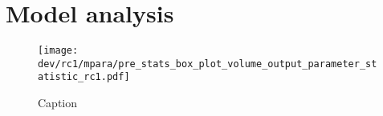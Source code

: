 % 
\chapter{Model analysis}
\label{app:modelAnalysis}
% 
\begin{figure}[H]
    \centering
    \texttt{[image: dev/rc1/mpara/pre\_stats\_box\_plot\_volume\_output\_parameter\_statistic\_rc1.pdf]}
    \caption{Caption}
    \label{fig:appModelVolumeBoxPlot}
\end{figure}
% 

